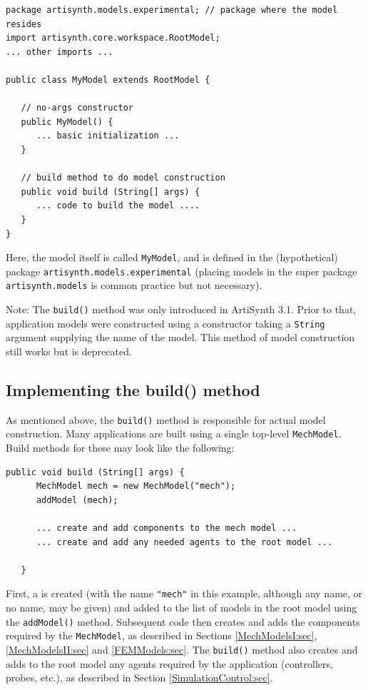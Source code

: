 \begin{lstlisting}[]
package artisynth.models.experimental; // package where the model resides
import artisynth.core.workspace.RootModel;
... other imports ...

public class MyModel extends RootModel {

   // no-args constructor
   public MyModel() {
      ... basic initialization ...
   }

   // build method to do model construction
   public void build (String[] args) {
      ... code to build the model ....
   }
}
\end{lstlisting}
Here, the model itself is called {\tt MyModel}, and is defined in the
(hypothetical) 
package {\tt artisynth.models.experimental} (placing models in the super
package {\tt artisynth.models} is common practice but not
necessary).

\begin{sideblock}
Note: The {\tt build()} method was only introduced in ArtiSynth
3.1. Prior to that, application models were constructed using a
constructor taking a {\tt String} argument supplying the name of the
model. This method of model construction still works but is
deprecated.
\end{sideblock}

\subsection{Implementing the build() method}

As mentioned above, the {\tt build()} method is responsible for actual
model construction.  Many applications are built using a single
top-level {\tt MechModel}.  Build methods for these may look
like the following:
\begin{lstlisting}[]
   public void build (String[] args) {
      MechModel mech = new MechModel("mech");
      addModel (mech);

      ... create and add components to the mech model ...
      ... create and add any needed agents to the root model ...

   }
\end{lstlisting}
First, a  is created
(with the name {\tt "mech"} in this example, although any name, or no
name, may be given) and added to the list of models in the root model
using the {\tt addModel()} method. Subsequent code then creates and
adds the components required by the {\tt MechModel}, as described in
Sections \ref{MechModelsI:sec}, \ref{MechModelsII:sec} and
\ref{FEMModels:sec}.  The {\tt build()} method also creates and adds
to the root model any agents required by the application (controllers,
probes, etc.), as described in Section \ref{SimulationControl:sec}.


